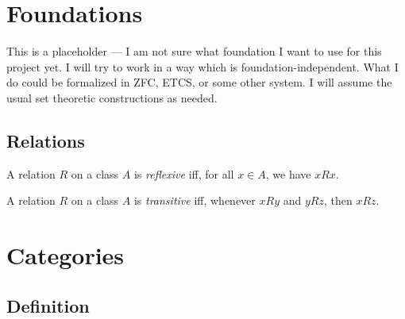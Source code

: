 \newcommand{\dom}{\ensuremath{\operatorname{dom}}}
\newcommand{\cod}{\ensuremath{\operatorname{cod}}}
\newcommand{\colim}{\ensuremath{\operatorname{colim}}}
\newcommand{\Cat}{\ensuremath{\mathbf{Cat}}}

\chapter{Foundations}

This is a placeholder --- I am not sure what foundation I want to use for this
project yet. I will try to work in a way which is foundation-independent. What
I do could be formalized in ZFC, ETCS, or some other system. I will assume the
usual set theoretic constructions as needed. 

\section{Relations}

\begin{df}[Reflexive]
A relation $R$ on a class $A$ is \emph{reflexive} iff, for all $x \in A$, we have $xRx$.
\end{df}

\begin{df}[Transitive]
A relation $R$ on a class $A$ is \emph{transitive} iff, whenever $xRy$ and $yRz$, then $xRz$.
\end{df}

\chapter{Categories}

\section{Definition}


